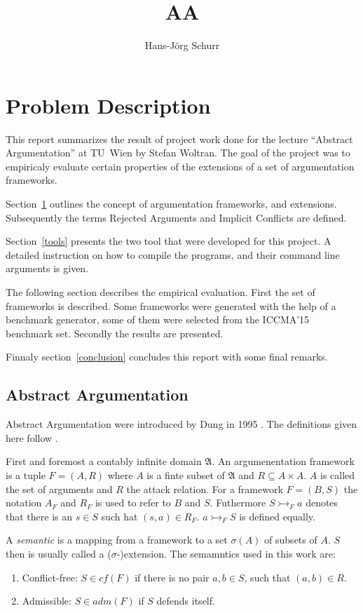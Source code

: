 \documentclass{scrartcl}
\title{AA}
\author{Hans-Jörg Schurr}
\begin{document}
\maketitle
\tableofcontents

\section{Problem Description}
\label{problemdesc}
This report summarizes the result of project work done for the lecture ``Abstract Argumentation'' at TU~Wien by
Stefan Woltran. The goal of the project was to empiricaly evaluate certain properties of the extensions of a set
of argumentation frameworks.

Section~\ref{problemdesc} outlines the concept of argumentation frameworks, and
extensions. Subsequently the terms Rejected Arguments and Implicit Conflicts
are defined.

Section~\ref{tools} presents the two tool that were developed for this project.
A detailed instruction on how to compile the programs, and their command line
arguments is given.

The following section describes the empirical evaluation. First the set of
frameworks is described.  Some frameworks were generated with the help of a
benchmark generator, some of them were selected from the ICCMA'15 benchmark
set. Secondly the results are presented.

Finnaly section~\ref{conclusion} concludes this report with some final remarks.

\subsection{Abstract Argumentation}

Abstract Argumentation were introduced by Dung in 1995 \cite{dung95}. The definitions given
here follow \cite{linsbichler2015hidden}.

First and foremost a contably infinite domain $\mathfrak{A}$. An
argumenentation framework is a tuple $F = (A,R)$ where $A$ is a finte subset of
$\mathfrak{A}$ and $R \subseteq A\times A$.  $A$ is called the set of arguments
and $R$ the attack relation. For a framework $F = (B, S)$ the notation $A_F$
and $R_F$ is used to refer to $B$ and $S$. Futhermore $S \rightarrowtail_F a$
denotes that there is an $s \in S$ such hat $(s, a) \in R_F$. $a
\rightarrowtail_F S$ is defined equally. 

A \emph{semantic} is a mapping from a framework to a set $\sigma(A)$ of subsets of $A$.
$S$ then is usually called a ($\sigma$-)extension. The semamntics used in this
work are:
\begin{enumerate}
  \item Conflict-free: $S \in cf(F)$ if there is no pair $a,b \in S$, such that $(a,b) \in R$.
  \item Admissible: $S \in adm(F)$ if $S$ defends itself.
\end{enumerate}
\end{document}
